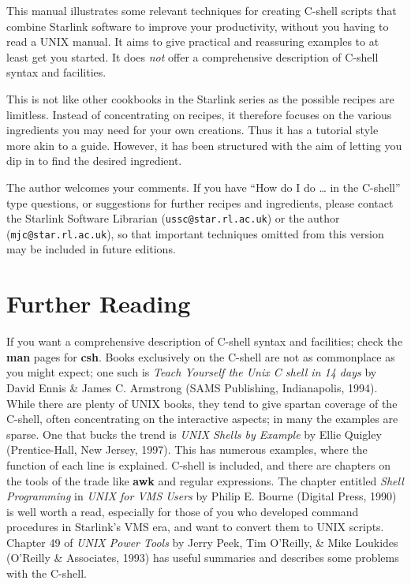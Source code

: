 \documentclass[twoside,11pt]{article}
\newcommand{\htmlref}[2]{#1}
\begin{document}
This manual illustrates some relevant techniques for creating C-shell
scripts that combine Starlink software to improve your productivity,
without you having to read a UNIX manual.  It aims to give practical and
reassuring examples to at least get you started.  It does {\em not\/}
offer a comprehensive description of C-shell syntax and facilities.

This is not like other cookbooks in the Starlink series as the
possible recipes are limitless.  Instead of concentrating on recipes,
it therefore focuses on the various ingredients you may need for your
own creations.  Thus it has a tutorial style more akin to a guide.
However, it has been structured with the aim of letting you dip in to
find the desired ingredient.

The author welcomes your comments.  If you have ``How do I do \ldots
in the C-shell'' type questions, or suggestions for further recipes
and ingredients, please contact the Starlink Software Librarian
({\tt{ussc@star.rl.ac.uk}}) or the author ({\tt{mjc@star.rl.ac.uk}}), so that
important techniques omitted from this version may be included in future
editions.

\section{Further Reading}

If you want a comprehensive description of C-shell syntax and
facilities; check the {\bf man} pages for {\bf csh}.  Books
exclusively on the C-shell are not as commonplace as you might expect;
one such is {\sl Teach Yourself the Unix C shell in 14 days} by David
Ennis \& James C. Armstrong (SAMS Publishing, Indianapolis, 1994).
While there are plenty of UNIX books, they tend to give spartan
coverage of the C-shell, often concentrating on the interactive
aspects; in many the examples are sparse.  One that bucks the trend is
{\sl UNIX Shells by Example} by Ellie Quigley (Prentice-Hall, New
Jersey, 1997).  This has numerous examples, where the function of each
line is explained.  C-shell is included, and there are chapters on the
tools of the trade like {\bf awk} and \htmlref{regular
expressions}{sc4_gl_reg_exp}.  The chapter entitled {\it Shell
Programming\/} in {\sl UNIX for VMS Users\/} by Philip E. Bourne
(Digital Press, 1990) is well worth a read, especially for those of
you who developed command procedures in Starlink's VMS era, and want
to convert them to UNIX scripts.  Chapter 49 of {\sl UNIX Power Tools}
by Jerry Peek, Tim O'Reilly, \& Mike Loukides (O'Reilly \& Associates,
1993) has useful summaries and describes some problems with the
C-shell.
\end{document}
